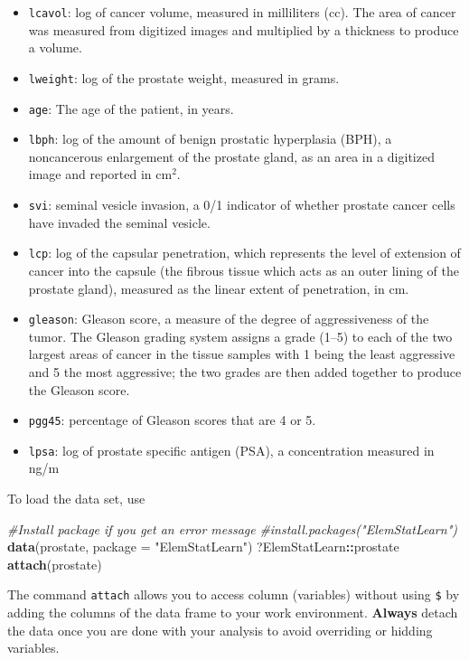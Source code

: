 \documentclass[]{book}
\newenvironment{Shaded}{\begin{snugshade}}{\end{snugshade}}
\newcommand{\KeywordTok}[1]{\textcolor[rgb]{0.13,0.29,0.53}{\textbf{#1}}}
\newcommand{\DataTypeTok}[1]{\textcolor[rgb]{0.13,0.29,0.53}{#1}}
\newcommand{\StringTok}[1]{\textcolor[rgb]{0.31,0.60,0.02}{#1}}
\newcommand{\CommentTok}[1]{\textcolor[rgb]{0.56,0.35,0.01}{\textit{#1}}}
\newcommand{\OperatorTok}[1]{\textcolor[rgb]{0.81,0.36,0.00}{\textbf{#1}}}
\newcommand{\NormalTok}[1]{#1}
\providecommand{\tightlist}{%
  \setlength{\itemsep}{0pt}\setlength{\parskip}{0pt}}
\theoremstyle{definition}
\theoremstyle{definition}
\theoremstyle{definition}
\theoremstyle{remark}
\begin{document}
\begin{itemize}
\tightlist
\item
  \texttt{lcavol}: log of cancer volume, measured in milliliters (cc).
  The area of cancer was measured from digitized images and multiplied
  by a thickness to produce a volume.
\item
  \texttt{lweight}: log of the prostate weight, measured in grams.
\item
  \texttt{age}: The age of the patient, in years.
\item
  \texttt{lbph}: log of the amount of benign prostatic hyperplasia
  (BPH), a noncancerous enlargement of the prostate gland, as an area in
  a digitized image and reported in cm\({}^2\).
\item
  \texttt{svi}: seminal vesicle invasion, a 0/1 indicator of whether
  prostate cancer cells have invaded the seminal vesicle.
\item
  \texttt{lcp}: log of the capsular penetration, which represents the
  level of extension of cancer into the capsule (the fibrous tissue
  which acts as an outer lining of the prostate gland), measured as the
  linear extent of penetration, in cm.
\item
  \texttt{gleason}: Gleason score, a measure of the degree of
  aggressiveness of the tumor. The Gleason grading system assigns a
  grade (1--5) to each of the two largest areas of cancer in the tissue
  samples with 1 being the least aggressive and 5 the most aggressive;
  the two grades are then added together to produce the Gleason score.
\item
  \texttt{pgg45}: percentage of Gleason scores that are 4 or 5.
\item
  \texttt{lpsa}: log of prostate specific antigen (PSA), a concentration
  measured in ng/m
\end{itemize}

To load the data set, use

\begin{Shaded}
\begin{Highlighting}[]
\CommentTok{#Install package if you get an error message}
\CommentTok{#install.packages("ElemStatLearn")}
\KeywordTok{data}\NormalTok{(prostate, }\DataTypeTok{package =} \StringTok{"ElemStatLearn"}\NormalTok{)}
\NormalTok{?ElemStatLearn}\OperatorTok{::}\NormalTok{prostate}
\KeywordTok{attach}\NormalTok{(prostate) }
\end{Highlighting}
\end{Shaded}

The command \texttt{attach} allows you to access column (variables)
without using \texttt{\$} by adding the columns of the data frame to
your work environment. \textbf{Always} detach the data once you are done
with your analysis to avoid overriding or hidding variables.
\end{document}
